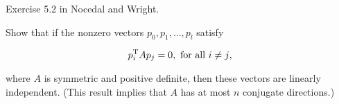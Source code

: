 \begin{problem}
  Exercise 5.2 in Nocedal and Wright.

  Show that if the nonzero vectors $p_0,p_1,\ldots,p_l$ satisfy
  
  \[p_i^{\textnormal{T}} A p_{j} = 0, \textnormal{ for all } i \ne j\text{,}\]
  
  \noindent
  where $A$ is symmetric and positive definite, then these vectors are linearly independent. (This result implies that $A$ has at most $n$ conjugate directions.)
\end{problem}

